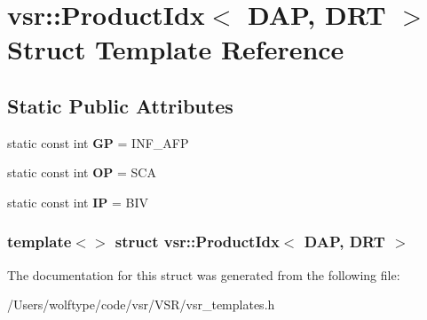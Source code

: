 \hypertarget{structvsr_1_1_product_idx_3_01_d_a_p_00_01_d_r_t_01_4}{\section{vsr\-:\-:Product\-Idx$<$ D\-A\-P, D\-R\-T $>$ Struct Template Reference}
\label{structvsr_1_1_product_idx_3_01_d_a_p_00_01_d_r_t_01_4}
}
\subsection*{Static Public Attributes}
\begin{DoxyCompactItemize}
\item 
\hypertarget{structvsr_1_1_product_idx_3_01_d_a_p_00_01_d_r_t_01_4_a292c629ea9deb0c67aa4cbd6f40f6885}{static const int {\bfseries G\-P} = I\-N\-F\-\_\-\-A\-F\-P}\label{structvsr_1_1_product_idx_3_01_d_a_p_00_01_d_r_t_01_4_a292c629ea9deb0c67aa4cbd6f40f6885}

\item 
\hypertarget{structvsr_1_1_product_idx_3_01_d_a_p_00_01_d_r_t_01_4_a760ae100cf23786c08d137cb9e9b621d}{static const int {\bfseries O\-P} = S\-C\-A}\label{structvsr_1_1_product_idx_3_01_d_a_p_00_01_d_r_t_01_4_a760ae100cf23786c08d137cb9e9b621d}

\item 
\hypertarget{structvsr_1_1_product_idx_3_01_d_a_p_00_01_d_r_t_01_4_a775946620606e322d6b68d384d8f82b1}{static const int {\bfseries I\-P} = B\-I\-V}\label{structvsr_1_1_product_idx_3_01_d_a_p_00_01_d_r_t_01_4_a775946620606e322d6b68d384d8f82b1}

\end{DoxyCompactItemize}
\subsubsection*{template$<$$>$ struct vsr\-::\-Product\-Idx$<$ D\-A\-P, D\-R\-T $>$}



The documentation for this struct was generated from the following file\-:\begin{DoxyCompactItemize}
\item 
/\-Users/wolftype/code/vsr/\-V\-S\-R/vsr\-\_\-templates.\-h\end{DoxyCompactItemize}
